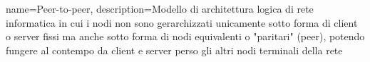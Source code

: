 {
	name={Peer-to-peer},
	description={Modello di architettura logica di rete informatica in cui i nodi non sono gerarchizzati unicamente sotto forma di client o server fissi ma anche sotto forma di nodi equivalenti o "paritari" (peer), potendo fungere al contempo da client e server perso gli altri nodi terminali della rete}
}